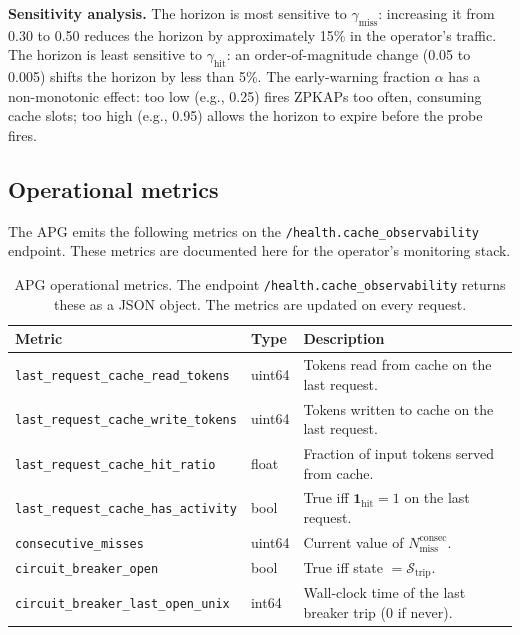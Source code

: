 \noindent
\textbf{Sensitivity analysis.} The horizon is most sensitive to
$\gamma_{\text{miss}}$: increasing it from 0.30 to 0.50 reduces
the horizon by approximately 15\% in the operator's traffic.
The horizon is least sensitive to $\gamma_{\text{hit}}$: an
order-of-magnitude change (0.05 to 0.005) shifts the horizon
by less than 5\%. The early-warning fraction $\alpha$ has a
non-monotonic effect: too low (e.g., 0.25) fires ZPKAPs too
often, consuming cache slots; too high (e.g., 0.95) allows the
horizon to expire before the probe fires.

\subsection{Operational metrics}
\label{app:apg:metrics}

The APG emits the following metrics on the
\texttt{/health.cache\_observability} endpoint. These metrics
are documented here for the operator's monitoring stack.

\begin{table}[ht]
\centering
\caption{APG operational metrics. The endpoint
\texttt{/health.cache\_observability} returns these as a JSON
object. The metrics are updated on every request.}
\label{tab:apg-metrics}
\begin{tabular}{lll}
\toprule
\textbf{Metric} & \textbf{Type} & \textbf{Description} \\
\midrule
\texttt{last\_request\_cache\_read\_tokens}    & uint64 & Tokens read from cache on the last request. \\
\texttt{last\_request\_cache\_write\_tokens}   & uint64 & Tokens written to cache on the last request. \\
\texttt{last\_request\_cache\_hit\_ratio}     & float  & Fraction of input tokens served from cache. \\
\texttt{last\_request\_cache\_has\_activity}   & bool   & True iff $\mathbf{1}_{\text{hit}} = 1$ on the last request. \\
\texttt{consecutive\_misses}                  & uint64 & Current value of $N_{\text{miss}}^{\text{consec}}$. \\
\texttt{circuit\_breaker\_open}                & bool   & True iff state $= \mathcal{S}_{\text{trip}}$. \\
\texttt{circuit\_breaker\_last\_open\_unix}    & int64  & Wall-clock time of the last breaker trip (0 if never). \\
\bottomrule
\end{tabular}
\end{table}

